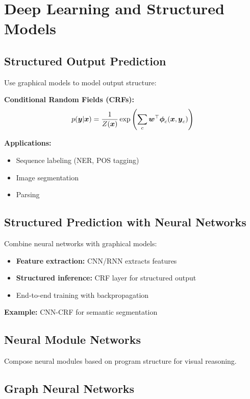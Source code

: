 
\section{Deep Learning and Structured Models}
\label{sec:deep-structured}

\subsection{Structured Output Prediction}

Use graphical models to model output structure:

\textbf{Conditional Random Fields (CRFs):}
\begin{equation}
p(\boldsymbol{y}|\boldsymbol{x}) = \frac{1}{Z(\boldsymbol{x})} \exp\left(\sum_c \boldsymbol{w}^\top \boldsymbol{\phi}_c(\boldsymbol{x}, \boldsymbol{y}_c)\right)
\end{equation}

\textbf{Applications:}
\begin{itemize}
    \item Sequence labeling (NER, POS tagging)
    \item Image segmentation
    \item Parsing
\end{itemize}

\subsection{Structured Prediction with Neural Networks}

Combine neural networks with graphical models:
\begin{itemize}
    \item \textbf{Feature extraction:} CNN/RNN extracts features
    \item \textbf{Structured inference:} CRF layer for structured output
    \item End-to-end training with backpropagation
\end{itemize}

\textbf{Example:} CNN-CRF for semantic segmentation

\subsection{Neural Module Networks}

Compose neural modules based on program structure for visual reasoning.

\subsection{Graph Neural Networks}

